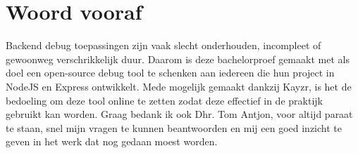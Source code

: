 
\chapter*{Woord vooraf}
\label{ch:voorwoord}


Backend debug toepassingen zijn vaak slecht onderhouden, incompleet of gewoonweg verschrikkelijk duur. Daarom is deze bachelorproef gemaakt met als doel een open-source debug tool te schenken aan iedereen die hun project in NodeJS en Express ontwikkelt. Mede mogelijk gemaakt dankzij Kayzr, is het de bedoeling om deze tool online te zetten zodat deze effectief in de praktijk gebruikt kan worden. Graag bedank ik ook Dhr. Tom Antjon, voor altijd paraat te staan, snel mijn vragen te kunnen beantwoorden en mij een goed inzicht te geven in het werk dat nog gedaan moest worden.

